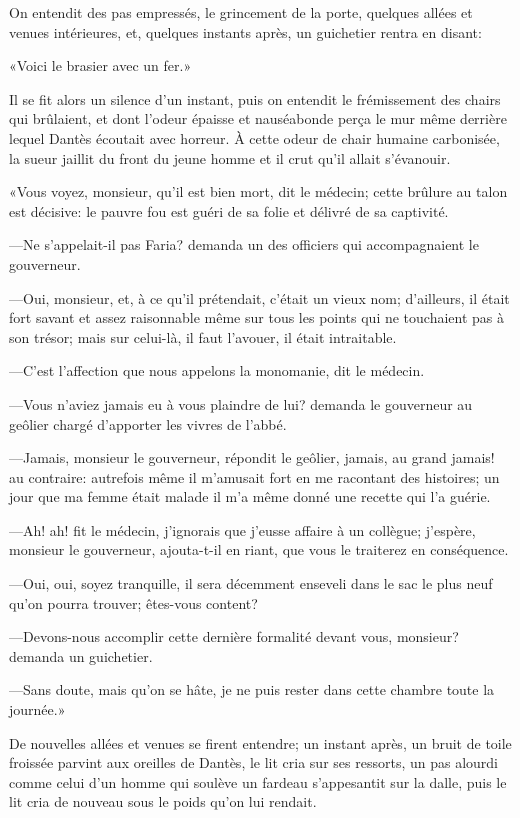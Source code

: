 On entendit des pas empressés, le grincement de la porte, quelques allées et venues intérieures, et, quelques instants après, un guichetier rentra en disant:

«Voici le brasier avec un fer.»

Il se fit alors un silence d'un instant, puis on entendit le frémissement des chairs qui brûlaient, et dont l'odeur épaisse et nauséabonde perça le mur même derrière lequel Dantès écoutait avec horreur. À cette odeur de chair humaine carbonisée, la sueur jaillit du front du jeune homme et il crut qu'il allait s'évanouir.

«Vous voyez, monsieur, qu'il est bien mort, dit le médecin; cette brûlure au talon est décisive: le pauvre fou est guéri de sa folie et délivré de sa captivité.

—Ne s'appelait-il pas Faria? demanda un des officiers qui accompagnaient le gouverneur.

—Oui, monsieur, et, à ce qu'il prétendait, c'était un vieux nom; d'ailleurs, il était fort savant et assez raisonnable même sur tous les points qui ne touchaient pas à son trésor; mais sur celui-là, il faut l'avouer, il était intraitable.

—C'est l'affection que nous appelons la monomanie, dit le médecin.

—Vous n'aviez jamais eu à vous plaindre de lui? demanda le gouverneur au geôlier chargé d'apporter les vivres de l'abbé.

—Jamais, monsieur le gouverneur, répondit le geôlier, jamais, au grand jamais! au contraire: autrefois même il m'amusait fort en me racontant des histoires; un jour que ma femme était malade il m'a même donné une recette qui l'a guérie.

—Ah! ah! fit le médecin, j'ignorais que j'eusse affaire à un collègue; j'espère, monsieur le gouverneur, ajouta-t-il en riant, que vous le traiterez en conséquence.

—Oui, oui, soyez tranquille, il sera décemment enseveli dans le sac le plus neuf qu'on pourra trouver; êtes-vous content?

—Devons-nous accomplir cette dernière formalité devant vous, monsieur? demanda un guichetier.

—Sans doute, mais qu'on se hâte, je ne puis rester dans cette chambre toute la journée.»

De nouvelles allées et venues se firent entendre; un instant après, un bruit de toile froissée parvint aux oreilles de Dantès, le lit cria sur ses ressorts, un pas alourdi comme celui d'un homme qui soulève un fardeau s'appesantit sur la dalle, puis le lit cria de nouveau sous le poids qu'on lui rendait.

